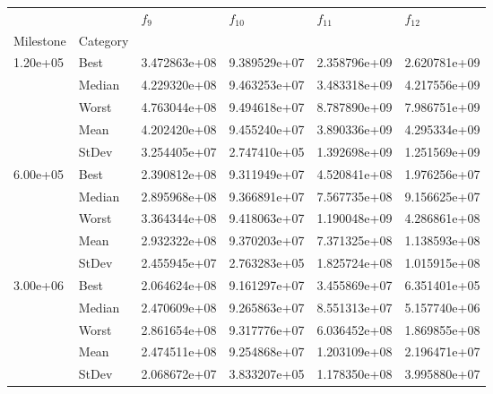 \begin{tabular}{llllll}
\toprule
         &      &      $f_{9}$ &     $f_{10}$ &     $f_{11}$ &     $f_{12}$ \\
Milestone & Category &              &              &              &              \\
\midrule
\multirow{5}{*}{1.20e+05} & Best & 3.472863e+08 & 9.389529e+07 & 2.358796e+09 & 2.620781e+09 \\
         & Median & 4.229320e+08 & 9.463253e+07 & 3.483318e+09 & 4.217556e+09 \\
         & Worst & 4.763044e+08 & 9.494618e+07 & 8.787890e+09 & 7.986751e+09 \\
         & Mean & 4.202420e+08 & 9.455240e+07 & 3.890336e+09 & 4.295334e+09 \\
         & StDev & 3.254405e+07 & 2.747410e+05 & 1.392698e+09 & 1.251569e+09 \\
\cline{1-6}
\multirow{5}{*}{6.00e+05} & Best & 2.390812e+08 & 9.311949e+07 & 4.520841e+08 & 1.976256e+07 \\
         & Median & 2.895968e+08 & 9.366891e+07 & 7.567735e+08 & 9.156625e+07 \\
         & Worst & 3.364344e+08 & 9.418063e+07 & 1.190048e+09 & 4.286861e+08 \\
         & Mean & 2.932322e+08 & 9.370203e+07 & 7.371325e+08 & 1.138593e+08 \\
         & StDev & 2.455945e+07 & 2.763283e+05 & 1.825724e+08 & 1.015915e+08 \\
\cline{1-6}
\multirow{5}{*}{3.00e+06} & Best & 2.064624e+08 & 9.161297e+07 & 3.455869e+07 & 6.351401e+05 \\
         & Median & 2.470609e+08 & 9.265863e+07 & 8.551313e+07 & 5.157740e+06 \\
         & Worst & 2.861654e+08 & 9.317776e+07 & 6.036452e+08 & 1.869855e+08 \\
         & Mean & 2.474511e+08 & 9.254868e+07 & 1.203109e+08 & 2.196471e+07 \\
         & StDev & 2.068672e+07 & 3.833207e+05 & 1.178350e+08 & 3.995880e+07 \\
\bottomrule
\end{tabular}
